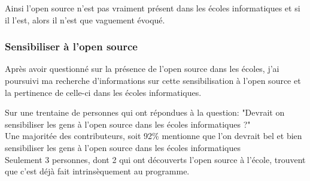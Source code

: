 				Ainsi l'open source n'est pas vraiment présent dans les écoles informatiques et si il l'est, alors il n'est que vaguement évoqué.

			\subsubsection{Sensibiliser à l'open source}

				Après avoir questionné sur la présence de l'open source dans les écoles, j'ai poursuivi ma recherche d'informations sur cette sensibilisation à l'open source et la pertinence de celle-ci dans les écoles informatiques.

				Sur une trentaine de personnes qui ont répondues à la question: "Devrait on sensibiliser les gens à l'open source dans les écoles informatiques ?"\\

				Une majoritée des contributeurs, soit 92\% mentionne que l'on devrait bel et bien sensibiliser les gens à l'open source dans les écoles informatiques\\

				Seulement 3 personnes, dont 2 qui ont découverts l'open source à l'école, trouvent que c'est déjà fait intrinsèquement au programme.\\


